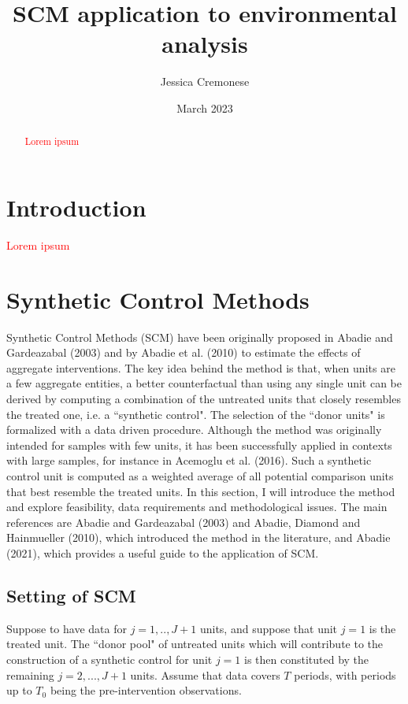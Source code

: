 \documentclass[12pt,a4paper,draft]{article}
\begin{document}
\begin{titlepage}
\title{SCM application to environmental analysis}
\author{Jessica Cremonese}
\date{March 2023}
\maketitle
\end{titlepage}

\tableofcontents

\newpage
\begin{abstract}
    \textcolor{red}{Lorem ipsum}
\end{abstract}
\newpage


\section{Introduction}
\textcolor{red}{Lorem ipsum}




\section{Synthetic Control Methods}
Synthetic Control Methods (SCM) have been originally proposed in Abadie and Gardeazabal 
(2003) and by Abadie et al. (2010) to estimate the effects of aggregate interventions.
The key idea behind the method is that, when units are a few aggregate entities, 
a better counterfactual than using any single unit can be derived by computing a 
combination of the untreated units that closely resembles the treated one, i.e. 
a ``synthetic control". The selection of the ``donor units" is formalized with a data
driven procedure.
Although the method was originally intended for samples with few units, it has been 
successfully applied in contexts with large samples, for instance in Acemoglu et 
al. (2016).
Such a synthetic control unit is computed as a weighted average of all potential 
comparison units that best resemble the treated units. In this section, I will 
introduce the method and explore feasibility, data requirements and methodological 
issues. 
The main references are Abadie and Gardeazabal (2003) and Abadie, Diamond and 
Hainmueller (2010), which introduced the method in the literature, and Abadie 
(2021), which provides a useful guide to the application of SCM.

\subsection{Setting of SCM}
Suppose to have data for $j=1,..,J+1$ units, and suppose that unit $j=1$ is the 
treated unit. The ``donor pool" of untreated units which will contribute to the 
construction of a synthetic control for unit $j=1$ is then constituted by the 
remaining $j=2,...,J+1$ units.
Assume that data covers $T$ periods, with periods up to $T_0$ being the 
pre-intervention observations.
\end{document}
